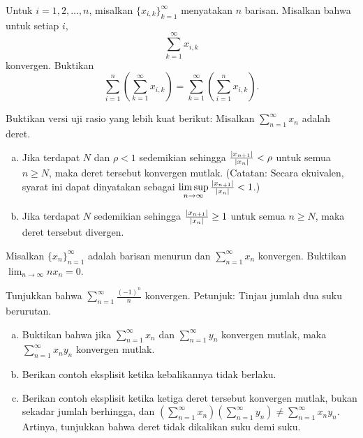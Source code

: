 \begin{exercise}
Untuk $i=1,2,\ldots,n$, misalkan $\{ x_{i,k} \}_{k=1}^\infty$ menyatakan $n$
barisan.  Misalkan bahwa untuk setiap $i$,
\begin{equation*}
\sum_{k=1}^\infty x_{i,k}
\end{equation*}
konvergen.  Buktikan
\begin{equation*}
\sum_{i=1}^n \left( \sum_{k=1}^\infty x_{i,k} \right)
=
\sum_{k=1}^\infty \left( \sum_{i=1}^n x_{i,k} \right) .
\end{equation*}
\end{exercise}

\begin{exercise} \label{exercise:strongerratiotest}
Buktikan versi uji rasio yang lebih kuat berikut:
Misalkan $\sum_{n=1}^\infty x_n$ adalah deret.
\begin{enumerate}[a)]
\item
Jika terdapat $N$ dan $\rho < 1$ sedemikian sehingga
$\frac{\lvert {x_{n+1}} \rvert}{\lvert {x_n} \rvert} < \rho$ untuk semua $n \geq N$,
maka deret tersebut konvergen mutlak.
(Catatan: Secara ekuivalen, syarat ini dapat dinyatakan sebagai
$\limsup\limits_{n\to\infty} \frac{\lvert {x_{n+1}} \rvert}{\lvert {x_n} \rvert} < 1$.)
\item
Jika terdapat $N$ sedemikian sehingga
$\frac{\lvert {x_{n+1}} \rvert}{\lvert {x_n} \rvert} \geq 1$
untuk semua $n \geq N$,
maka deret tersebut divergen. 
\end{enumerate}
\end{exercise}

\begin{exercise}[Menantang]
Misalkan $\{ x_n \}_{n=1}^\infty$ adalah barisan menurun dan
$\sum_{n=1}^\infty x_n$ konvergen.
Buktikan $\displaystyle \lim_{n\to\infty} n x_n = 0$.
\end{exercise}

\begin{exercise}
Tunjukkan bahwa $\displaystyle \sum_{n=1}^\infty \frac{{(-1)}^n}{n}$ konvergen.
Petunjuk: Tinjau jumlah dua suku berurutan.
\end{exercise}

\begin{exercise}
\leavevmode
\begin{enumerate}[a)]
\item Buktikan bahwa jika $\sum_{n=1}^\infty x_n$ dan $\sum_{n=1}^\infty y_n$ konvergen mutlak, maka
$\sum_{n=1}^\infty x_ny_n$ konvergen mutlak.
\item Berikan contoh eksplisit ketika kebalikannya tidak berlaku.
\item Berikan contoh eksplisit ketika ketiga deret tersebut konvergen mutlak,
bukan sekadar jumlah berhingga,
dan $\left(\sum_{n=1}^\infty x_n\right)\left(\sum_{n=1}^\infty y_n\right)
\neq \sum_{n=1}^\infty x_ny_n$.  Artinya, tunjukkan bahwa deret tidak
dikalikan suku demi suku.
\end{enumerate}
\end{exercise}


